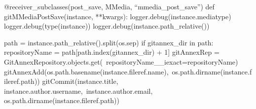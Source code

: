 \begin{code}
@receiver_subclasses(post_save, MMedia, ``mmedia_post_save'')
def gitMMediaPostSave(instance, **kwargs):
    logger.debug(instance.mediatype)
    logger.debug(type(instance))
    logger.debug(instance.path_relative())

    path = instance.path_relative().split(os.sep)
    if gitannex_dir in path:
        repositoryName = path[path.index(gitannex_dir) + 1]
        gitAnnexRep = GitAnnexRepository.objects.get(\
                      repositoryName__iexact=repositoryName)
        gitAnnexAdd(os.path.basename(instance.fileref.name),\
                    os.path.dirname(instance.fileref.path))
        gitCommit(instance.title, instance.author.username,\
                  instance.author.email, os.path.dirname(instance.fileref.path))
\end{code}







